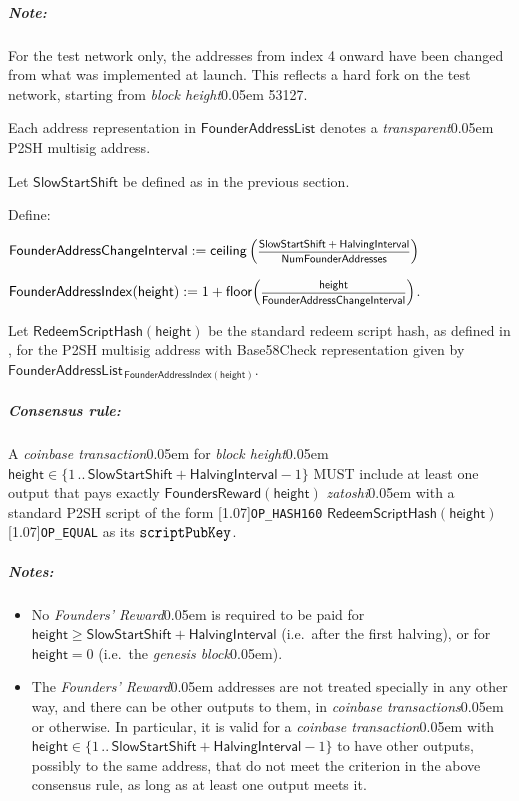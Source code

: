 \documentclass{article}
\let\oldtexttt\texttt
\let\oldmathtt\mathtt
\renewcommand{\texttt}[1]{\scalebox{1.02}[1.07]{\oldtexttt{#1}}}
\renewcommand{\mathtt}[1]{\scalebox{1.02}[1.07]{$\oldmathtt{#1}$}}
\newcommand{\textbnx}[1]{{\fontseries{b}\selectfont #1}}
\renewcommand{\arraystretch}{1.4}
\newcommand{\introlist}{\needspace{15ex}}
\newcommand{\hfrac}[2]{\scalebox{0.8}{$\genfrac{}{}{0.5pt}{0}{#1}{#2}$}}
\newcommand{\term}[1]{\textsl{#1}\kern 0.05em\xspace}
\newcommand{\conformance}[1]{\textbnx{#1}\xspace}
\newcommand{\zatoshi}{\term{zatoshi}}
\newcommand{\MUST}{\conformance{MUST}}
\newcommand{\blockHeight}{\term{block height}}
\newcommand{\genesisBlock}{\term{genesis block}}
\newcommand{\coinbaseTransaction}{\term{coinbase transaction}}
\newcommand{\coinbaseTransactions}{\term{coinbase transactions}}
\newcommand{\transparent}{\term{transparent}}
\newcommand{\range}[2]{\{{#1}\,..\,{#2}\}}
\newcommand{\floor}[1]{\mathsf{floor}\!\left({#1}\right)}
\newcommand{\ceiling}[1]{\mathsf{ceiling}\left({#1}\right)}
\newcommand{\FoundersReward}{\mathsf{FoundersReward}}
\newcommand{\SlowStartShift}{\mathsf{SlowStartShift}}
\newcommand{\HalvingInterval}{\mathsf{HalvingInterval}}
\newcommand{\NumFounderAddresses}{\mathsf{NumFounderAddresses}}
\newcommand{\FounderAddressChangeInterval}{\mathsf{FounderAddressChangeInterval}}
\newcommand{\BlockHeight}{\mathsf{height}}
\newcommand{\FounderAddressList}{\mathsf{FounderAddressList}}
\newcommand{\FounderAddressIndex}{\mathsf{FounderAddressIndex}}
\newcommand{\RedeemScriptHash}{\mathsf{RedeemScriptHash}}
\newcommand{\foundersReward}{\term{Founders' Reward}}
\newcommand{\scriptPubKey}{\mathtt{scriptPubKey}}
\newcommand{\ScriptOP}[1]{\texttt{OP\_{#1}}}
\newcommand{\consensusrule}[1]{\needspace{3ex}\subparagraph{Consensus rule:}{#1}}
\newcommand{\pnote}[1]{\subparagraph{Note:}{#1}}
\newenvironment{pnotes}{\introlist\subparagraph{Notes:}\begin{itemize}}{\end{itemize}}
\begin{document}
\renewcommand{\arraystretch}{1}

\pnote{For the test network only, the addresses from index 4 onward have been changed from
what was implemented at launch. This reflects a hard fork on the test network, starting
from \blockHeight 53127. \cite{ZcashIssue-2113}}

Each address representation in $\FounderAddressList$ denotes a \transparent
P2SH multisig address.

\introlist
Let $\SlowStartShift$ be defined as in the previous section.

Define:

\begin{formulae}
  \item $\FounderAddressChangeInterval := \ceiling{\hfrac{\SlowStartShift + \HalvingInterval}{\NumFounderAddresses}}$
  \item $\FounderAddressIndex(\BlockHeight) := 1 + \floor{\hfrac{\BlockHeight}{\FounderAddressChangeInterval}}$.
\end{formulae}

Let $\RedeemScriptHash(\BlockHeight)$ be the standard redeem script hash, as defined in
\cite{Bitcoin-Multisig}, for the P2SH multisig address with Base58Check representation
given by $\FounderAddressList_{\,\FounderAddressIndex(\BlockHeight)}$.

\consensusrule{
A \coinbaseTransaction for \blockHeight $\BlockHeight \in \range{1}{\SlowStartShift + \HalvingInterval - 1}$
\MUST include at least one output that pays exactly $\FoundersReward(\BlockHeight)$ \zatoshi
with a standard P2SH script of the form \ScriptOP{HASH160} \;$\RedeemScriptHash(\BlockHeight)$\; \ScriptOP{EQUAL}
as its $\scriptPubKey$.
}

\begin{pnotes}
  \item No \foundersReward is required to be paid for $\BlockHeight \geq \SlowStartShift + \HalvingInterval$
        (i.e.\ after the first halving), or for $\BlockHeight = 0$ (i.e.\ the \genesisBlock).
  \item The \foundersReward addresses are not treated specially in any other way, and
        there can be other outputs to them, in \coinbaseTransactions or otherwise.
        In particular, it is valid for a \coinbaseTransaction with
        $\BlockHeight \in \range{1}{\SlowStartShift + \HalvingInterval - 1}$ to have
        other outputs, possibly to the same address, that do not meet the criterion
        in the above consensus rule, as long as at least one output meets it.
\end{pnotes}
\end{document}
